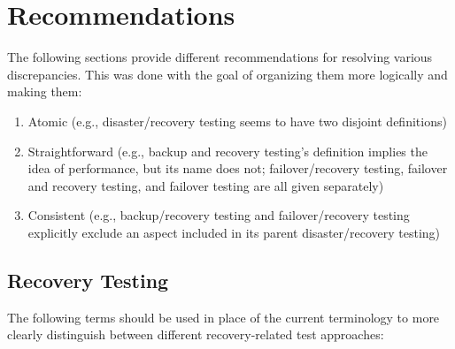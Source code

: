 \section{Recommendations}

The following sections provide different recommendations for resolving various
discrepancies. This was done with the goal of
organizing them more logically and making them:
\begin{enumerate}
      \item Atomic (e.g., disaster/recovery testing seems to have two
            disjoint definitions)
      \item Straightforward (e.g., backup and recovery testing's definition
            implies the idea of performance, but its name does not;
            failover/recovery testing, failover and recovery testing,
            and failover testing are all given separately)
      \item Consistent (e.g., backup/recovery testing and failover/recovery
            testing explicitly exclude an aspect included in its parent
            disaster/recovery testing)
\end{enumerate}

\subsection{Recovery Testing}
The following terms should be used in place of the current terminology to
more clearly distinguish between different recovery-related test approaches:

